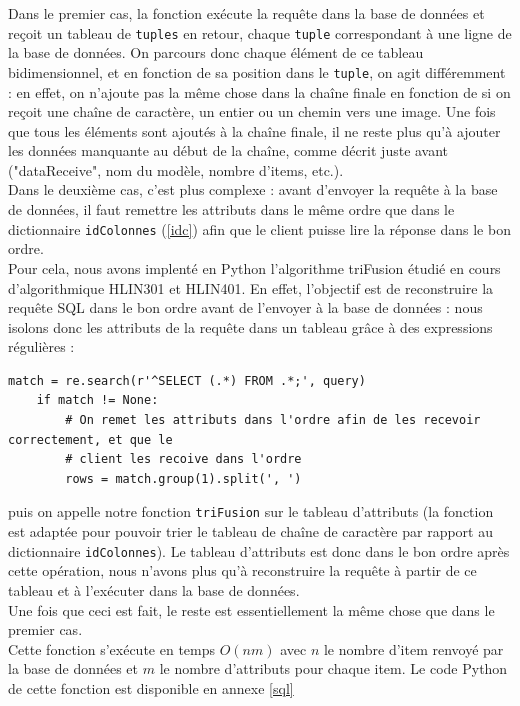 \documentclass[twoside]{report}
\begin{document}
Dans le premier cas, la fonction exécute la requête dans la base de données et reçoit un tableau de \verb!tuples! en retour, chaque \verb!tuple! correspondant à une ligne de la base de données. On parcours donc chaque élément de ce tableau bidimensionnel, et en fonction de sa position dans le \verb!tuple!, on agit différemment : en effet, on n'ajoute pas la même chose dans la chaîne finale en fonction de si on reçoit une chaîne de caractère, un entier ou un chemin vers une image. Une fois que tous les éléments sont ajoutés à la chaîne finale, il ne reste plus qu'à ajouter les données manquante au début de la chaîne, comme décrit juste avant ("dataReceive", nom du modèle, nombre d'items, etc.). \\

Dans le deuxième cas, c'est plus complexe : avant d'envoyer la requête à la base de données, il faut remettre les attributs dans le même ordre que dans le dictionnaire \verb!idColonnes! (\ref{idc}) afin que le client puisse lire la réponse dans le bon ordre. \\
Pour cela, nous avons implenté en Python l'algorithme triFusion étudié en cours d'algorithmique HLIN301 et HLIN401. En effet, l'objectif est de reconstruire la requête SQL dans le bon ordre avant de l'envoyer à la base de données : nous isolons donc les attributs de la requête dans un tableau grâce à des expressions régulières :
\begin{lstlisting}[style=py, caption=serveur.py : expressions régulières, label=idc]
    match = re.search(r'^SELECT (.*) FROM .*;', query)
    if match != None:
        # On remet les attributs dans l'ordre afin de les recevoir correctement, et que le
        # client les recoive dans l'ordre
        rows = match.group(1).split(', ')
\end{lstlisting}
puis on appelle notre fonction \verb!triFusion! sur le tableau d'attributs (la fonction est adaptée pour pouvoir trier le tableau de chaîne de caractère par rapport au dictionnaire \verb!idColonnes!). Le tableau d'attributs est donc dans le bon ordre après cette opération, nous n'avons plus qu'à reconstruire la requête à partir de ce tableau et à l'exécuter dans la base de données. \\
Une fois que ceci est fait, le reste est essentiellement la même chose que dans le premier cas. \\

Cette fonction s'exécute en temps $O(nm)$ avec $n$ le nombre d'item renvoyé par la base de données et $m$ le nombre d'attributs pour chaque item. Le code Python de cette fonction est disponible en annexe \ref{sql}
\end{document}
